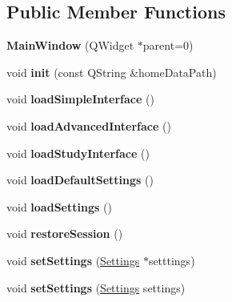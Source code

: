 \subsection*{Public Member Functions}
\begin{DoxyCompactItemize}
\item 
\hypertarget{classMainWindow_a8b244be8b7b7db1b08de2a2acb9409db}{
{\bfseries MainWindow} (QWidget $\ast$parent=0)}
\label{classMainWindow_a8b244be8b7b7db1b08de2a2acb9409db}

\item 
\hypertarget{classMainWindow_a1f508b9d9a5a263923fb3cc8fc9972b7}{
void {\bfseries init} (const QString \&homeDataPath)}
\label{classMainWindow_a1f508b9d9a5a263923fb3cc8fc9972b7}

\item 
\hypertarget{classMainWindow_abd169790e33b6568ba2229df1d4b4e51}{
void {\bfseries loadSimpleInterface} ()}
\label{classMainWindow_abd169790e33b6568ba2229df1d4b4e51}

\item 
\hypertarget{classMainWindow_a497461898e28b50f19b7c5c635fb0a40}{
void {\bfseries loadAdvancedInterface} ()}
\label{classMainWindow_a497461898e28b50f19b7c5c635fb0a40}

\item 
\hypertarget{classMainWindow_adfdcb49e4eabc699c5893a4612d2c627}{
void {\bfseries loadStudyInterface} ()}
\label{classMainWindow_adfdcb49e4eabc699c5893a4612d2c627}

\item 
\hypertarget{classMainWindow_a9b9a4d029dead797c739cb67dffc1b54}{
void {\bfseries loadDefaultSettings} ()}
\label{classMainWindow_a9b9a4d029dead797c739cb67dffc1b54}

\item 
\hypertarget{classMainWindow_a9bb1f3b7f6b5360abfd2dc01fc1c8930}{
void {\bfseries loadSettings} ()}
\label{classMainWindow_a9bb1f3b7f6b5360abfd2dc01fc1c8930}

\item 
\hypertarget{classMainWindow_a10f2072278f64aa75a70cc4aa5cd2db7}{
void {\bfseries restoreSession} ()}
\label{classMainWindow_a10f2072278f64aa75a70cc4aa5cd2db7}

\item 
\hypertarget{classMainWindow_a2daa5870beeb252bbab6ce99c072e339}{
void {\bfseries setSettings} (\hyperlink{classSettings}{Settings} $\ast$setttings)}
\label{classMainWindow_a2daa5870beeb252bbab6ce99c072e339}

\item 
\hypertarget{classMainWindow_af03afe1c5ec6d2af47478b31f241a598}{
void {\bfseries setSettings} (\hyperlink{classSettings}{Settings} settings)}
\label{classMainWindow_af03afe1c5ec6d2af47478b31f241a598}


\end{DoxyCompactItemize}
